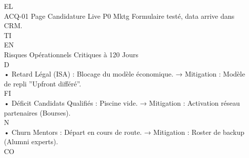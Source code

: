 \documentclass[12pt,landscape,a4paper]{article}
\begin{document}
\vspace{0.5em}
\vspace{0.5em}
EL\\
ACQ-01 Page Candidature Live          P0 Mktg          Formulaire testé, data arrive dans CRM.\\
\vspace{0.5em}
\vspace{0.5em}
\vspace{0.5em}
\vspace{0.5em}
TI\\
EN\\
Risques Opérationnels Critiques à 120 Jours\\
\vspace{0.5em}
\vspace{0.5em}
\vspace{0.5em}
\vspace{0.5em}
D\\
• Retard Légal (ISA) : Blocage du modèle économique. → Mitigation : Modèle de repli ”Upfront différé”.\\
\vspace{0.5em}
\vspace{0.5em}
\vspace{0.5em}
\vspace{0.5em}
FI\\
• Déficit Candidats Qualifiés : Piscine vide. → Mitigation : Activation réseau partenaires (Bourses).\\
\vspace{0.5em}
N\\
• Churn Mentors : Départ en cours de route. → Mitigation : Roster de backup (Alumni experts).\\
CO\\
\vspace{0.5em}
\end{document}

